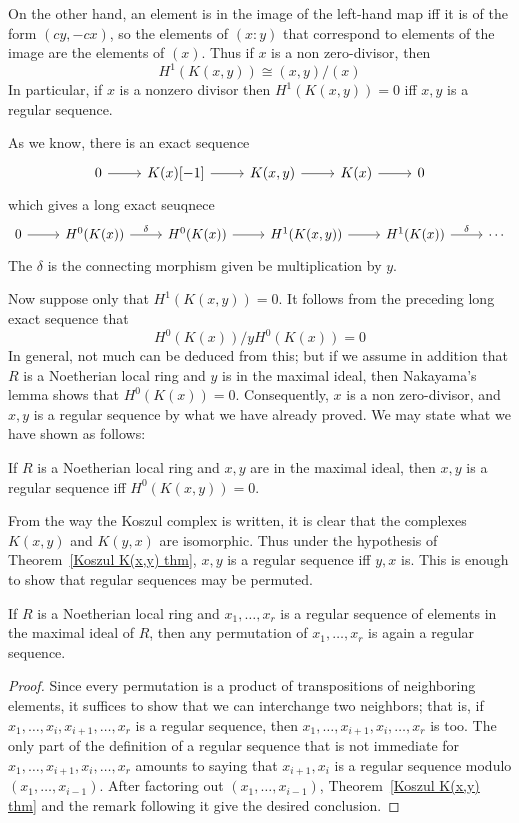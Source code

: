 On the other hand, an element is in the image of the left-hand map iff it
is of the form $(cy,-cx)$, so the elements of $(x:y)$ that correspond to elements of the image are the elements of $(x)$. Thus if $x$ is a non zero-divisor, then
\[H^1(K(x,y))\cong(x,y)/(x)\]
In particular, if $x$ is a nonzero divisor then $H^1(K(x,y))=0$ iff $x,y$ is a regular sequence.\par
\vspace{5mm}
As we know, there is an exact sequence
\[\begin{tikzcd}
0\ar[r]&K(x)[-1]\ar[r]&K(x,y)\ar[r]&K(x)\ar[r]&0
\end{tikzcd}\]
which gives a long exact seuqnece
\[\begin{tikzcd}
0\ar[r]&H^0(K(x))\ar[r,"\delta"]&H^0(K(x))\ar[r]&H^1(K(x,y))\ar[r]&H^1(K(x))\ar[r,"\delta"]&\cdots
\end{tikzcd}\]
The $\delta$ is the connecting morphism given be multiplication by $y$.\par
Now suppose only that $H^1(K(x,y))=0$. It follows from the preceding long exact sequence that
\[H^0(K(x))/yH^0(K(x))=0\]
In general, not much can be deduced from this; but if we assume in addition
that $R$ is a Noetherian local ring and $y$ is in the maximal ideal, then Nakayama's lemma shows that $H^0(K(x))=0$. Consequently, $x$ is a non zero-divisor, and $x,y$ is a regular sequence by what we have already proved. We may state what we have shown as follows:
\begin{theorem}\label{Koszul K(x,y) thm}
If $R$ is a Noetherian local ring and $x,y$ are in the maximal ideal, then $x,y$ is a regular sequence iff $H^0(K(x,y))=0$.
\end{theorem}
From the way the Koszul complex is written, it is clear that the complexes $K(x,y)$ and $K(y,x)$ are isomorphic. Thus under the hypothesis of Theorem~\ref{Koszul K(x,y) thm}, $x,y$ is a regular sequence iff $y,x$ is. This is enough to show that regular sequences may be permuted.
\begin{corollary}
If $R$ is a Noetherian local ring and $x_1,\dots,x_r$ is a regular sequence of elements in the maximal ideal of $R$, then any permutation of
$x_1,\dots,x_r$ is again a regular sequence.
\end{corollary}
\begin{proof}
Since every permutation is a product of transpositions of neighboring
elements, it suffices to show that we can interchange two neighbors; that is, if $x_1,\dots,x_{i},x_{i+1},\dots,x_r$ is a regular sequence, then $x_1,\dots,x_{i+1},x_i,\dots,x_r$ is too. The only part of the definition of a regular sequence that is not immediate for $x_1,\dots,x_{i+1},x_i,\dots,x_r$ amounts to saying that $x_{i+1},x_i$ is a regular sequence modulo $(x_1,\dots,x_{i-1})$. After factoring out $(x_1,\dots,x_{i-1})$, Theorem~\ref{Koszul K(x,y) thm} and the remark following it give the desired conclusion.
\end{proof}
